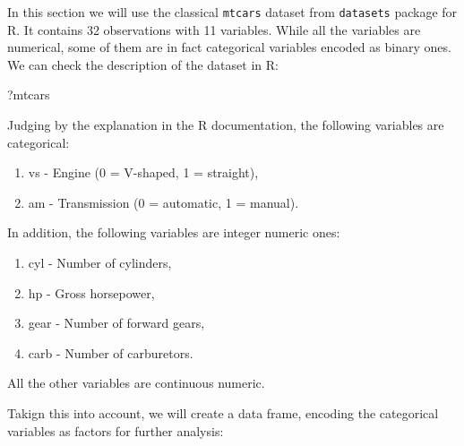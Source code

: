 \documentclass[
]{book}
\newenvironment{Shaded}{\begin{snugshade}}{\end{snugshade}}
\newcommand{\DataTypeTok}[1]{\textcolor[rgb]{0.13,0.29,0.53}{#1}}
\newcommand{\DecValTok}[1]{\textcolor[rgb]{0.00,0.00,0.81}{#1}}
\newcommand{\KeywordTok}[1]{\textcolor[rgb]{0.13,0.29,0.53}{\textbf{#1}}}
\newcommand{\NormalTok}[1]{#1}
\newcommand{\OperatorTok}[1]{\textcolor[rgb]{0.81,0.36,0.00}{\textbf{#1}}}
\newcommand{\StringTok}[1]{\textcolor[rgb]{0.31,0.60,0.02}{#1}}
\providecommand{\tightlist}{%
  \setlength{\itemsep}{0pt}\setlength{\parskip}{0pt}}
\theoremstyle{definition}
\theoremstyle{definition}
\theoremstyle{definition}
\theoremstyle{definition}
\theoremstyle{remark}
\begin{document}
In this section we will use the classical \texttt{mtcars} dataset from \texttt{datasets} package for R. It contains 32 observations with 11 variables. While all the variables are numerical, some of them are in fact categorical variables encoded as binary ones. We can check the description of the dataset in R:

\begin{Shaded}
\begin{Highlighting}[]
\NormalTok{?mtcars}
\end{Highlighting}
\end{Shaded}

Judging by the explanation in the R documentation, the following variables are categorical:

\begin{enumerate}
\def\labelenumi{\arabic{enumi}.}
\tightlist
\item
  vs - Engine (0 = V-shaped, 1 = straight),
\item
  am - Transmission (0 = automatic, 1 = manual).
\end{enumerate}

In addition, the following variables are integer numeric ones:

\begin{enumerate}
\def\labelenumi{\arabic{enumi}.}
\tightlist
\item
  cyl - Number of cylinders,
\item
  hp - Gross horsepower,
\item
  gear - Number of forward gears,
\item
  carb - Number of carburetors.
\end{enumerate}

All the other variables are continuous numeric.

Takign this into account, we will create a data frame, encoding the categorical variables as factors for further analysis:

\begin{Shaded}
\end{Shaded}
\end{document}
